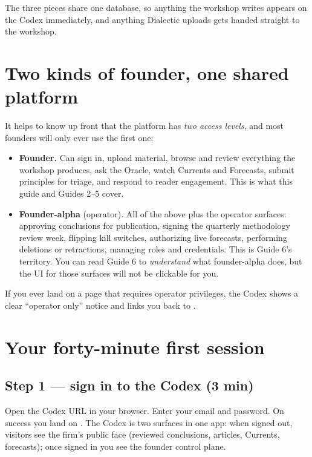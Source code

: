 \documentclass[11pt]{article}
\begin{document}
The three pieces share one database, so anything the workshop writes
appears on the Codex immediately, and anything Dialectic uploads gets
handed straight to the workshop.

\section{Two kinds of founder, one shared platform}

It helps to know up front that the platform has \emph{two access
levels}, and most founders will only ever use the first one:

\begin{itemize}[leftmargin=*,itemsep=0.2em]
  \item \textbf{Founder.} Can sign in, upload material, browse and
        review everything the workshop produces, ask the Oracle, watch
        Currents and Forecasts, submit principles for triage, and
        respond to reader engagement. This is what this guide and
        Guides 2--5 cover.
  \item \textbf{Founder-alpha} (operator). All of the above plus the
        operator surfaces: approving conclusions for publication,
        signing the quarterly methodology review week, flipping kill
        switches, authorizing live forecasts, performing deletions or
        retractions, managing roles and credentials. This is Guide
        6's territory. You can read Guide 6 to \emph{understand} what
        founder-alpha does, but the UI for those surfaces will not be
        clickable for you.
\end{itemize}

If you ever land on a page that requires operator privileges, the
Codex shows a clear ``operator only'' notice and links you back to
.

\section{Your forty-minute first session}

\subsection{Step 1 --- sign in to the Codex (3 min)}

Open the Codex URL in your browser. Enter your email and password.
On success you land on . The Codex is two surfaces in
one app: when signed out, visitors see the firm's public face
(reviewed conclusions, articles, Currents, forecasts); once signed in
you see the founder control plane.
\end{document}
